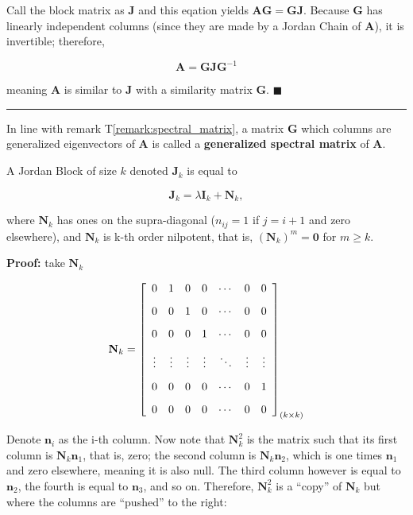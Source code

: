 	Call the block matrix as $\mathbf{J}$ and this eqation yields $\mathbf{AG = GJ}$. Because $\mathbf{G}$ has linearly independent columns (since they are made by a Jordan Chain of $\mathbf{A}$), it is invertible; therefore,

\begin{equation} \mathbf{A = GJG}^{-1} \end{equation}

	\noindent meaning $\mathbf{A}$ is similar to $\mathbf{J}$ with a similarity matrix $\mathbf{G}$.
\hfill$\blacksquare$
\vspace{5mm}
\hrule
\vspace{5mm} %
\begin{remark} In line with remark T\ref{remark:spectral_matrix}, a matrix $\mathbf{G}$ which columns are generalized eigenvectors of $\mathbf{A}$ is called a \textbf{generalized spectral matrix} of $\mathbf{A}$. \end{remark}

\begin{corollary}\label{corollary:jordan_nk} %
	A Jordan Block of size $k$ denoted $\mathbf{J}_k$ is equal to

\begin{equation} \mathbf{J}_k = \lambda\mathbf{I}_k + \mathbf{N}_k,\end{equation}

	\noindent where $\mathbf{N}_k$ has ones on the supra-diagonal ($n_{ij} = 1$ if $j = i + 1$ and zero elsewhere), and $\mathbf{N}_k$ is k-th order nilpotent, that is, $\left(\mathbf{N}_k\right)^m = \mathbf{0}$ for $m\geq k$.
\end{corollary}
\noindent\textbf{Proof:} take $\mathbf{N}_k$ 

\begin{equation}
	\mathbf{N}_k = \left[\raisebox{15mm}{} \begin{array}{ccccccc} 0 & 1 & 0 & 0 & \cdots & 0 & 0 \\[3mm] 0 & 0 & 1 & 0 & \cdots & 0 & 0 \\[3mm] 0 & 0 &  0 & 1 & \cdots & 0 & 0 \\[3mm] \vdots & \vdots & \vdots & \vdots & \ddots & \vdots & \vdots \\[3mm] 0 & 0 & 0 & 0 & \cdots & 0 & 1 \\[3mm] 0 & 0 & 0 & 0 & \cdots & 0 & 0 \end{array}\right]_{(k\times k)}
\end{equation}

	Denote $\mathbf{n}_i$ as the i-th column. Now note that $\mathbf{N}_k^2$ is the matrix such that its first column is $\mathbf{N}_k\mathbf{n}_1$, that is, zero; the second column is $\mathbf{N}_k\mathbf{n}_2$, which is one times $\mathbf{n}_1$ and zero elsewhere, meaning it is also null. The third column however is equal to $\mathbf{n}_2$, the fourth is equal to $\mathbf{n}_3$, and so on. Therefore, $\mathbf{N}_k^2$ is a ``copy'' of $\mathbf{N}_k$ but where the columns are ``pushed'' to the right:

